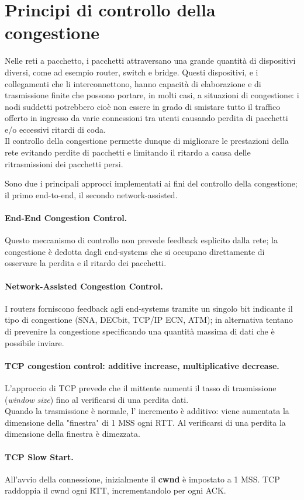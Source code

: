 \section{Principi di controllo della congestione}
Nelle reti a pacchetto, i pacchetti attraversano una grande quantità di dispositivi diversi, come ad esempio router, switch e bridge. Questi dispositivi, e i collegamenti che li interconnettono, hanno capacità di elaborazione e di trasmissione finite che possono portare, in molti casi, a situazioni di congestione: i nodi suddetti potrebbero cioè non essere in grado di smistare tutto il traffico offerto in ingresso da varie connessioni tra utenti causando perdita di pacchetti e/o eccessivi ritardi di coda.\\
Il controllo della congestione permette dunque di migliorare le prestazioni della rete evitando perdite di pacchetti e limitando il ritardo a causa delle ritrasmissioni dei pacchetti persi.

Sono due i principali approcci implementati ai fini del controllo della congestione; il primo end-to-end, il secondo network-assisted.

\paragraph{End-End Congestion Control.}
Questo meccanismo di controllo non prevede feedback esplicito dalla rete; la congestione è dedotta dagli end-systems che si occupano direttamente di osservare la perdita e il ritardo dei pacchetti.
\paragraph{Network-Assisted Congestion Control.} I routers forniscono feedback agli end-systems tramite un singolo bit indicante il tipo di congestione %
(SNA, DECbit, TCP/IP ECN, ATM); in alternativa tentano di prevenire la congestione specificando una quantità massima di dati che è possibile inviare.\\

\paragraph{TCP congestion control: additive increase, multiplicative decrease.}
L'approccio di TCP prevede che il mittente aumenti il tasso di trasmissione (\textit{window size}) fino al verificarsi di una perdita dati.\\
Quando la trasmissione è normale, l' incremento è additivo: viene aumentata la dimensione della "finestra" di 1 MSS ogni RTT.
Al verificarsi di una perdita la dimensione della finestra è dimezzata.


\paragraph{TCP Slow Start.}
All'avvio della connessione, inizialmente il \textbf{cwnd} è impostato a 1 MSS. 
TCP raddoppia il cwnd ogni RTT, incrementandolo per ogni ACK.